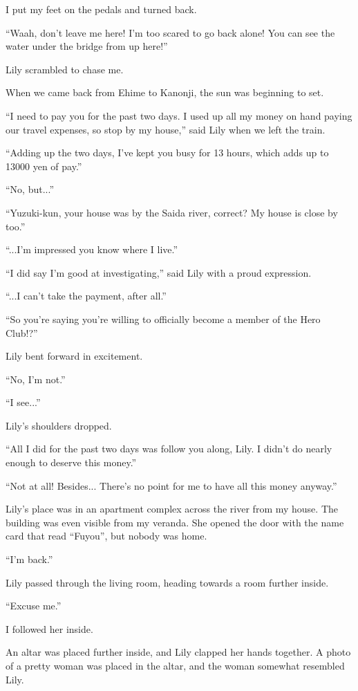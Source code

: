 I put my feet on the pedals and turned back.

``Waah, don't leave me here! I'm too scared to go back alone! You can see the water under the bridge from up here!''

Lily scrambled to chase me.

When we came back from Ehime to Kanonji, the sun was beginning to set.

``I need to pay you for the past two days. I used up all my money on hand paying our travel expenses, so stop by my house,'' said Lily when we left the train.

``Adding up the two days, I've kept you busy for 13 hours, which adds up to 13000 yen of pay.''

``No, but...''

``Yuzuki-kun, your house was by the Saida river, correct? My house is close by too.''

``...I'm impressed you know where I live.''

``I did say I'm good at investigating,'' said Lily with a proud expression.

``...I can't take the payment, after all.''

``So you're saying you're willing to officially become a member of the Hero Club!?''

Lily bent forward in excitement.

``No, I'm not.''

``I see...''

Lily's shoulders dropped.

``All I did for the past two days was follow you along, Lily. I didn't do nearly enough to deserve this money.''

``Not at all! Besides... There's no point for me to have all this money anyway.''

Lily's place was in an apartment complex across the river from my house. The building was even visible from my veranda. She opened the door with the name card that read ``Fuyou'', but nobody was home.

``I'm back.''

Lily passed through the living room, heading towards a room further inside.

``Excuse me.''

I followed her inside.

An altar was placed further inside, and Lily clapped her hands together. A photo of a pretty woman was placed in the altar, and the woman somewhat resembled Lily.

